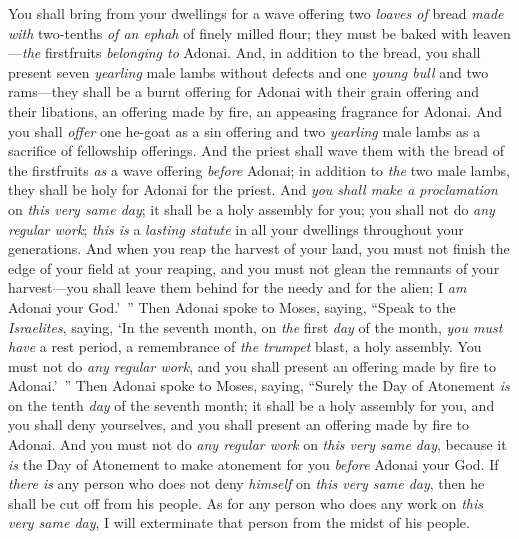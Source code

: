 \begin{biblechapter}
\verse You shall bring from your dwellings for a wave offering two \textit{loaves of} bread \textit{made with} two-tenths \textit{of an ephah} of finely milled flour; they must be baked with leaven—\textit{the} firstfruits \textit{belonging to} Adonai.
\verse And, in addition to the bread, you shall present seven \textit{yearling} male lambs without defects and one \textit{young bull} and two rams—they shall be a burnt offering for Adonai with their grain offering and their libations, an offering made by fire, an appeasing fragrance for Adonai.
\verse And you shall \textit{offer} one he-goat as a sin offering and two \textit{yearling} male lambs as a sacrifice of fellowship offerings.
\verse And the priest shall wave them with the bread of the firstfruits \textit{as} a wave offering \textit{before} Adonai; in addition to \textit{the} two male lambs, they shall be holy for Adonai for the priest.
\verse And \textit{you shall make a proclamation} on \textit{this very same day}; it shall be a holy assembly for you; you shall not do \textit{any regular work}; \textit{this is} a \textit{lasting statute} in all your dwellings throughout your generations.
\verse And when you reap the harvest of your land, you must not finish the edge of your field at your reaping, and you must not glean the remnants of your harvest—you shall leave them behind for the needy and for the alien; I \textit{am} Adonai your God.’ ”
 Then Adonai spoke to Moses, saying,
\verse “Speak to the \textit{Israelites}, saying, ‘In the seventh month, on \textit{the} first \textit{day} of the month, \textit{you must have} a rest period, a remembrance of \textit{the trumpet} blast, a holy assembly.
\verse You must not do \textit{any regular work}, and you shall present an offering made by fire to Adonai.’ ”
 Then Adonai spoke to Moses, saying,
\verse “Surely the Day of Atonement \textit{is} on the tenth \textit{day} of the seventh month; it shall be a holy assembly for you, and you shall deny yourselves, and you shall present an offering made by fire to Adonai.
\verse And you must not do \textit{any regular work} on \textit{this very same day}, because it \textit{is} the Day of Atonement to make atonement for you \textit{before} Adonai your God.
\verse If \textit{there is} any person who does not deny \textit{himself} on \textit{this very same day}, then he shall be cut off from his people.
\verse As for any person who does any work on \textit{this very same day}, I will exterminate that person from the midst of his people.

\end{biblechapter}
